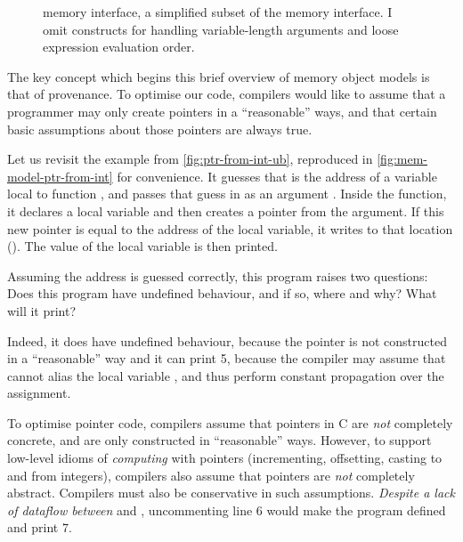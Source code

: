 \begin{figure}[tbhp]
    \small%
    \raggedright%
    \begingroup%
    \renewcommand{\cnprodline}[6]{& & $#1$ & $#2$ & $#3$ & $#5$ & }
    \grammartabularSTY{%
        \cnkillXXkind{}\cninterrule{}
        \cnaction{}\cninterrule{}
        \cnmemop{}\cnafterlastrule{}
    }
    \endgroup%
    \caption{ memory interface, a simplified subset of the 
        memory interface. I omit constructs for handling variable-length
        arguments and loose expression evaluation order.}\label{fig:mem-model-intf}
\end{figure}

The key concept which begins this brief overview of memory object models is that
of provenance. To optimise our code, compilers would like to assume that a
programmer may only create pointers in a ``reasonable'' ways, and that certain
basic assumptions about those pointers are always true.

Let us revisit the example from \cref{fig:ptr-from-int-ub}, reproduced in
\cref{fig:mem-model-ptr-from-int} for convenience.  It guesses that
 is the address of a variable local to function
, and passes that guess in as an argument . Inside the
function, it declares a local variable  and then creates a pointer
 from the argument. If this new pointer is equal to the address of
the local variable, it writes to that location ().
The value of the local variable is then printed.

Assuming the address is guessed correctly, this program raises two questions:
Does this program have undefined behaviour, and if so, where and why?  What will
it print?

Indeed, it does have undefined behaviour, because the pointer  is not
constructed in a ``reasonable'' way and it can print 5, because the compiler may
assume that  cannot alias the local variable , and thus
perform constant propagation over the assignment.

To optimise pointer code, compilers assume that pointers in C are \emph{not}
completely concrete, and are only constructed in ``reasonable'' ways. However,
to support low-level idioms of \emph{computing} with pointers (incrementing,
offsetting, casting to and from integers), compilers also assume that pointers
are \emph{not} completely abstract.  Compilers must also be conservative in such
assumptions. \emph{Despite a lack of dataflow between}  and
, uncommenting line 6 would make the program defined and print 7.

